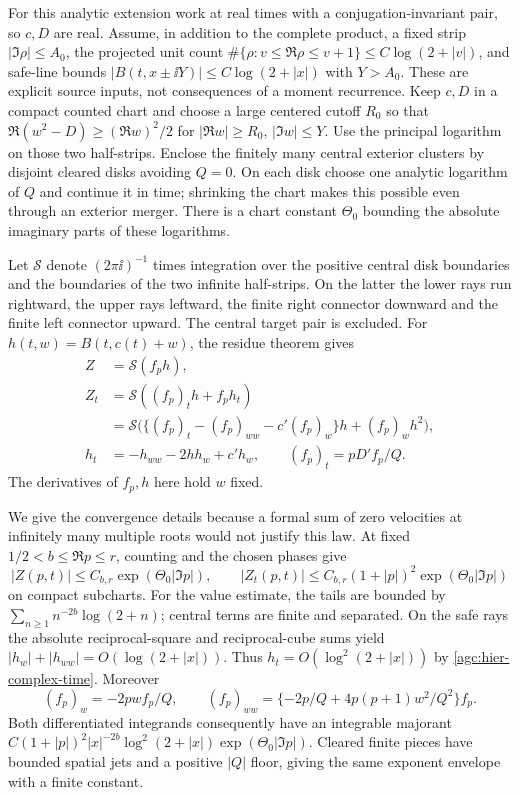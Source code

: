 For this analytic extension work at real times with a
conjugation-invariant pair, so $c,D$ are real. Assume, in addition to the complete
product, a fixed strip $|\Im\rho|\le A_0$, the projected unit count
$\#\{\rho:v\le\Re\rho\le v+1\}\le C\log(2+|v|)$,
and safe-line bounds
$|B(t,x\pm\ii Y)|\le C\log(2+|x|)$ with $Y>A_0$.
These are explicit source inputs, not consequences of a moment
recurrence. Keep $c,D$ in a compact counted chart and choose a large
centered cutoff $R_0$ so that $\Re(w^2-D)\ge(\Re w)^2/2$ for
$|\Re w|\ge R_0$, $|\Im w|\le Y$. Use the principal logarithm
on those two half-strips. Enclose the finitely many central exterior
clusters by disjoint cleared disks avoiding $Q=0$. On each disk
choose one analytic logarithm of $Q$ and continue it in time;
shrinking the chart makes this possible even through an exterior
merger. There is a chart constant $\Theta_0$ bounding the absolute
imaginary parts of these logarithms.

Let $\mathcal S$ denote $(2\pi\ii)^{-1}$ times integration over
the positive central disk boundaries and the boundaries of the two
infinite half-strips. On the latter the lower rays run rightward,
the upper rays leftward, the finite right connector downward and
the finite left connector upward. The central target pair is excluded.
For $h(t,w)=B(t,c(t)+w)$, the residue theorem gives
\begin{equation}
 \begin{split}
 Z&=\mathcal S(f_ph),\\
 Z_t&=\mathcal S((f_p)_t h+f_ph_t)\\
    &=\mathcal S\big(\{(f_p)_t-(f_p)_{ww}-c'(f_p)_w\}h
                                      +(f_p)_wh^2\big),\\
 h_t&=-h_{ww}-2hh_w+c'h_w,\qquad
 (f_p)_t=pD'f_p/Q.
 \end{split}
 \label{agc:hier-complex-time}
\end{equation}
The derivatives of $f_p,h$ here hold $w$ fixed.

We give the convergence details because a formal sum of zero
velocities at infinitely many multiple roots would not justify this
law. At fixed $1/2<b\le\Re p\le r$, counting and the chosen phases give
\begin{equation}
 |Z(p,t)|\le C_{b,r}\exp(\Theta_0|\Im p|),\qquad
 |Z_t(p,t)|\le C_{b,r}(1+|p|)^2\exp(\Theta_0|\Im p|)
 \label{agc:hier-p-envelope}
\end{equation}
on compact subcharts. For the value estimate, the tails are bounded
by $\sum_{n\ge1}n^{-2b}\log(2+n)$; central terms are finite and
separated. On the safe rays the absolute reciprocal-square and
reciprocal-cube sums yield $|h_w|+|h_{ww}|=O(\log(2+|x|))$.
Thus $h_t=O(\log^2(2+|x|))$ by \eqref{agc:hier-complex-time}.
Moreover
\[
 (f_p)_w=-2pw f_p/Q,\qquad
 (f_p)_{ww}=\{-2p/Q+4p(p+1)w^2/Q^2\}f_p.
\]
Both differentiated integrands consequently have an integrable
majorant $C(1+|p|)^2|x|^{-2b}\log^2(2+|x|)
\exp(\Theta_0|\Im p|)$. Cleared finite pieces have bounded
spatial jets and a positive $|Q|$ floor, giving the same exponent
envelope with a finite constant.

